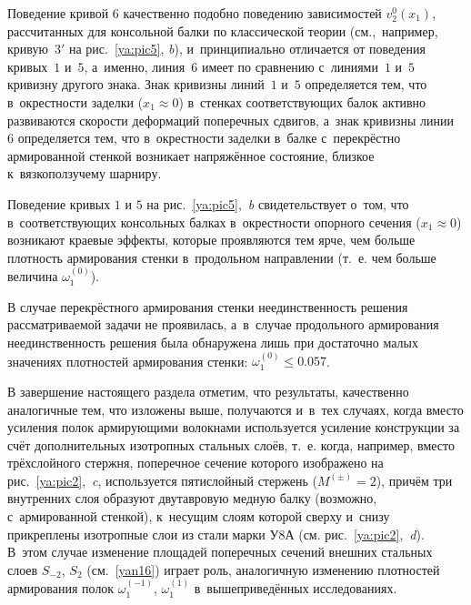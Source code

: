 Поведение кривой $6$ качественно подобно поведению зависимостей $v_2^0(x_1)$, 
рассчитанных для консольной балки по классической теории (см.,~например, кривую~$3'$ на рис.~\ref{ya:pic5}, {\sl b}), 
и~принципиально отличается от поведения кривых~$1$ и~$5$, а~именно, линия~$6$ имеет по сравнению с~линиями~$1$ и~$5$ кривизну другого знака. 
Знак кривизны линий~$1$ и~$5$ определяется тем, что в~окрестности заделки ($x_1\approx0$) в~стенках соответствующих балок активно развиваются скорости деформаций поперечных сдвигов, а~знак кривизны линии~$6$ определяется тем, 
что в~окрестности заделки в~балке с~перекрёстно армированной стенкой возникает напряжённое состояние, близкое к~вязкоползучему шарниру.

Поведение кривых $1$ и $5$ на рис.~\ref{ya:pic5},~{\sl b} свидетельствует о~том, что в~соответствующих консольных балках в~окрестности опорного сечения ($x_1\approx0$) возникают краевые эффекты, 
которые проявляются тем ярче, чем больше плотность армирования стенки в~продольном направлении (т.~е. чем больше величина $\omega_1^{(0)}$).

В случае перекрёстного армирования стенки неединственность решения рассматриваемой задачи не проявилась, 
а~в~случае продольного армирования неединственность решения была обнаружена лишь при достаточно малых значениях плотностей армирования стенки: $\omega_1^{(0)}\le0.057$.

В завершение настоящего раздела отметим, что результаты, качественно аналогичные тем, что изложены выше, получаются и~в~тех случаях, когда вместо усиления полок армирующими волокнами используется усиление конструкции за счёт дополнительных изотропных стальных слоёв, 
т.~е. когда, например, вместо трёхслойного стержня, поперечное сечение которого изображено на рис.~\ref{ya:pic2},~{\sl c}, используется пятислойный стержень ($M^{(\pm)}=2$), причём три внутренних слоя образуют двутавровую медную балку (возможно, с~армированной стенкой), к~несущим слоям которой сверху и~снизу прикреплены изотропные слои из стали марки У8А 
(см. рис.~\ref{ya:pic2},~{\sl d}). 
В~этом случае изменение площадей поперечных сечений внешних стальных слоев $S_{-2}$, $S_2$ 
(см.~\eqref{yan16}) играет роль, аналогичную изменению плотностей армирования полок $\omega_1^{(-1)}$, $\omega_1^{(1)}$ в~вышеприведённых исследованиях.


\smallskip

